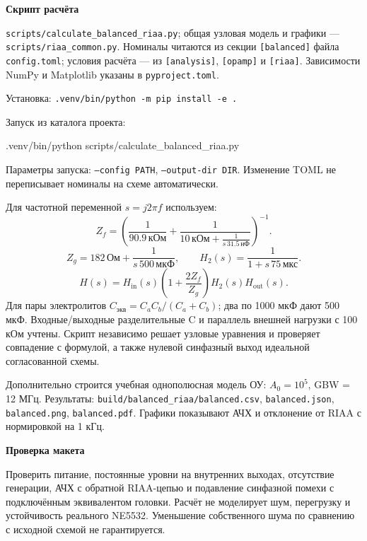 \documentclass[a4paper,landscape,10pt]{article}
\newcommand{\kohm}{\,\text{кОм}}
\newcommand{\ohm}{\,\text{Ом}}
\newcommand{\nf}{\,\text{нФ}}
\newcommand{\uf}{\,\text{мкФ}}
\begin{document}
\begin{minipage}[t]{0.43\linewidth}
\small\textbf{Скрипт расчёта}\par
\texttt{scripts/calculate\_balanced\_riaa.py}; общая узловая модель и графики —
\texttt{scripts/riaa\_common.py}. Номиналы читаются из секции
\texttt{[balanced]} файла \texttt{config.toml}; условия расчёта — из
\texttt{[analysis]}, \texttt{[opamp]} и \texttt{[riaa]}.
Зависимости NumPy и Matplotlib указаны в \texttt{pyproject.toml}.
\par\vspace{1mm}
Установка: \texttt{.venv/bin/python -m pip install -e .}\par
Запуск из каталога проекта:\par
{\footnotesize\ttfamily .venv/bin/python scripts/calculate\_balanced\_riaa.py}\par
Параметры запуска: \texttt{--config PATH}, \texttt{--output-dir DIR}.
Изменение TOML не переписывает номиналы на схеме автоматически.
\par\vspace{2mm}
Для частотной переменной $s=j2\pi f$ используем:
\[
 Z_f=\left(\frac1{90.9\kohm}
       +\frac1{10\kohm+\frac1{s\,31.5\nf}}\right)^{-1}.
\]
\[
 Z_g=182\ohm+\frac1{s\,500\uf},\qquad
 H_2(s)=\frac1{1+s\,75\,\text{мкс}}.
\]
\[
 H(s)=H_{\mathrm{in}}(s)
 \left(1+\frac{2Z_f}{Z_g}\right)H_2(s)H_{\mathrm{out}}(s).
\]
Для пары электролитов $C_{\mathrm{экв}}=C_aC_b/(C_a+C_b)$;
два по 1000 мкФ дают 500 мкФ.
Входные/выходные разделительные C и параллель внешней нагрузки с 100 кОм
учтены. Скрипт независимо решает узловые уравнения и проверяет совпадение с формулой,
а также нулевой синфазный выход идеальной согласованной схемы.
\par\vspace{1mm}
Дополнительно строится учебная однополюсная модель ОУ: $A_0=10^5$, GBW = 12 МГц.
Результаты: \texttt{build/balanced\_riaa/balanced.csv},
\texttt{balanced.json}, \texttt{balanced.png}, \texttt{balanced.pdf}.
Графики показывают АЧХ и отклонение от RIAA с нормировкой на 1 кГц.
\par\vspace{2mm}
\textbf{Проверка макета}\par
Проверить питание, постоянные уровни на внутренних выходах, отсутствие генерации,
АЧХ с обратной RIAA-цепью и подавление синфазной помехи с подключённым эквивалентом
головки. Расчёт не моделирует шум, перегрузку и устойчивость реального NE5532.
Уменьшение собственного шума по сравнению с исходной схемой не гарантируется.
\end{minipage}
\end{document}
